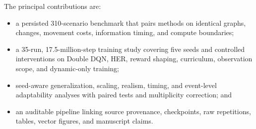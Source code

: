 The principal contributions are:
\begin{itemize}
    \item a persisted 310-scenario benchmark that pairs methods on identical
    graphs, changes, movement costs, information timing, and compute boundaries;
    \item a 35-run, 17.5-million-step training study covering five seeds and
    controlled interventions on Double DQN, HER, reward shaping, curriculum,
    observation scope, and dynamic-only training;
    \item seed-aware generalization, scaling, realism, timing, and event-level
    adaptability analyses with paired tests and multiplicity correction; and
    \item an auditable pipeline linking source provenance, checkpoints, raw
    repetitions, tables, vector figures, and manuscript claims.
\end{itemize}
